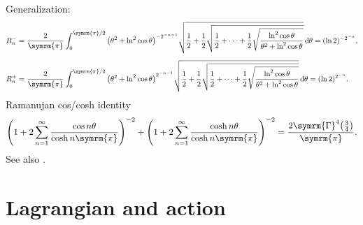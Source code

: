 \documentclass{article}
\def\pp{\symrm{\pi}}
\def\EulerGamma{\symrm{\Gamma}}
\def\fhalf{\frac{1}{2}}
\begin{document}
Generalization:
\begin{align}
  R_n^- &= \frac{2}{\pp} \int_0^{\pp/2} \qty(\theta^2+\ln^2\cos\theta)^{-2^{-n-1}}
           \sqrt{\fhalf+\fhalf\sqrt{\fhalf+\cdots+\fhalf\sqrt{
                                    \frac{\ln^2\cos\theta}{\theta^2+\ln^2\cos\theta}}}} \dd{\theta}
         = (\ln 2)^{-2^{-n}}, \\[1.2ex]
  R_n^+ &= \frac{2}{\pp} \int_0^{\pp/2} \qty(\theta^2+\ln^2\cos\theta)^{2^{-n-1}}
           \sqrt{\fhalf+\fhalf\sqrt{\fhalf+\cdots+\fhalf\sqrt{
                                    \frac{\ln^2\cos\theta}{\theta^2+\ln^2\cos\theta}}}} \dd{\theta}
         = (\ln 2)^{2^{-n}}.
\end{align}
Ramanujan cos/cosh identity \cite{mathworld:ramanujan-cos-cosh-identity}
\begin{equation}
    \qty(1+2\sum_{n=1}^\infty \frac{\cos  n\theta}{\cosh n\pp})^{-2}
  + \qty(1+2\sum_{n=1}^\infty \frac{\cosh n\theta}{\cosh n\pp})^{-2}
  = \frac{2\EulerGamma^4\qty(\frac{3}{4})}{\pp}.
\end{equation}
See also \cite{zhihu:ramanujan}.

\section{Lagrangian and action}
\end{document}
